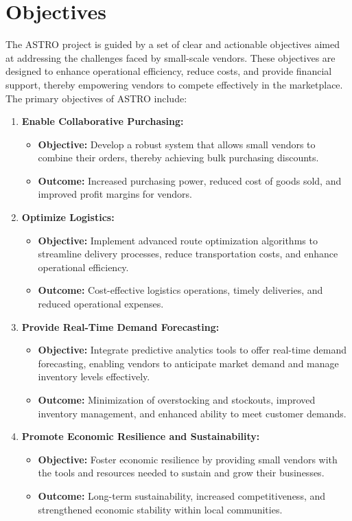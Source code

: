 \section{Objectives}
The ASTRO project is guided by a set of clear and actionable objectives aimed at addressing the challenges faced by small-scale vendors. These objectives are designed to enhance operational efficiency, reduce costs, and provide financial support, thereby empowering vendors to compete effectively in the marketplace. The primary objectives of ASTRO include:

\begin{enumerate}
	\item \textbf{Enable Collaborative Purchasing:}
	      \begin{itemize}
		      \item \textbf{Objective:} Develop a robust system that allows small vendors to combine their orders, thereby achieving bulk purchasing discounts.
		      \item \textbf{Outcome:} Increased purchasing power, reduced cost of goods sold, and improved profit margins for vendors.
	      \end{itemize}

	\item \textbf{Optimize Logistics:}
	      \begin{itemize}
		      \item \textbf{Objective:} Implement advanced route optimization algorithms to streamline delivery processes, reduce transportation costs, and enhance operational efficiency.
		      \item \textbf{Outcome:} Cost-effective logistics operations, timely deliveries, and reduced operational expenses.
	      \end{itemize}

	\item \textbf{Provide Real-Time Demand Forecasting:}
	      \begin{itemize}
		      \item \textbf{Objective:} Integrate predictive analytics tools to offer real-time demand forecasting, enabling vendors to anticipate market demand and manage inventory levels effectively.
		      \item \textbf{Outcome:} Minimization of overstocking and stockouts, improved inventory management, and enhanced ability to meet customer demands.
	      \end{itemize}


	\item \textbf{Promote Economic Resilience and Sustainability:}
	      \begin{itemize}
		      \item \textbf{Objective:} Foster economic resilience by providing small vendors with the tools and resources needed to sustain and grow their businesses.
		      \item \textbf{Outcome:} Long-term sustainability, increased competitiveness, and strengthened economic stability within local communities.
	      \end{itemize}


\end{enumerate}
